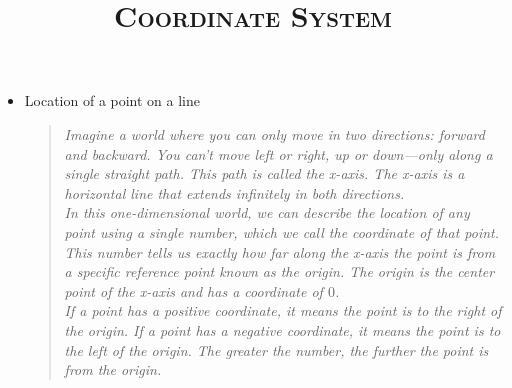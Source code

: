 \documentclass{article}
\title{\textsc{Coordinate System}}
\begin{document}
\maketitle

\begin{itemize}
    \item Location of a point on a line
    \begin{quote}
        \textit{
            Imagine a world where you can only move in two directions: forward and backward. You can't move left or right, up or down—only along a single straight path. This path is called the x-axis. The x-axis is a horizontal line that extends infinitely in both directions. \\[2mm]
            In this one-dimensional world, we can describe the location of any point using a single number, which we call the coordinate of that point. This number tells us exactly how far along the x-axis the point is from a specific reference point known as the origin. The origin is the center point of the x-axis and has a coordinate of $0$.\\[2mm]
            If a point has a positive coordinate, it means the point is to the right of the origin. If a point has a negative coordinate, it means the point is to the left of the origin. The greater the number, the further the point is from the origin.
        }
    \end{quote}

        \begin{center}
        \end{center}


\end{itemize}
\end{document}
